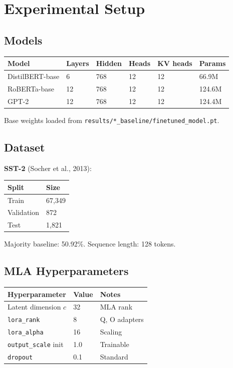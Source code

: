 
\section{Experimental Setup}

\subsection{Models}

\begin{table}[H]
\centering
\small
\begin{tabular}{llllll}
\toprule
\textbf{Model} & \textbf{Layers} & \textbf{Hidden} & \textbf{Heads} & \textbf{KV heads} & \textbf{Params} \\
\midrule
DistilBERT-base & 6 & 768 & 12 & 12 & 66.9M \\
RoBERTa-base & 12 & 768 & 12 & 12 & 124.6M \\
GPT-2 & 12 & 768 & 12 & 12 & 124.4M \\
\bottomrule
\end{tabular}
\end{table}

Base weights loaded from \texttt{results/*\_baseline/finetuned\_model.pt}.

\subsection{Dataset}

\textbf{SST-2} (Socher et al., 2013):

\begin{table}[H]
\centering
\small
\begin{tabular}{ll}
\toprule
\textbf{Split} & \textbf{Size} \\
\midrule
Train & 67,349 \\
Validation & 872 \\
Test & 1,821 \\
\bottomrule
\end{tabular}
\end{table}

Majority baseline: 50.92\%. Sequence length: 128 tokens.

\subsection{MLA Hyperparameters}

\begin{table}[H]
\centering
\small
\begin{tabular}{lll}
\toprule
\textbf{Hyperparameter} & \textbf{Value} & \textbf{Notes} \\
\midrule
Latent dimension $c$ & 32 & MLA rank \\
\texttt{lora\_rank} & 8 & Q, O adapters \\
\texttt{lora\_alpha} & 16 & Scaling \\
\texttt{output\_scale} init & 1.0 & Trainable \\
\texttt{dropout} & 0.1 & Standard \\
\bottomrule
\end{tabular}
\end{table}

